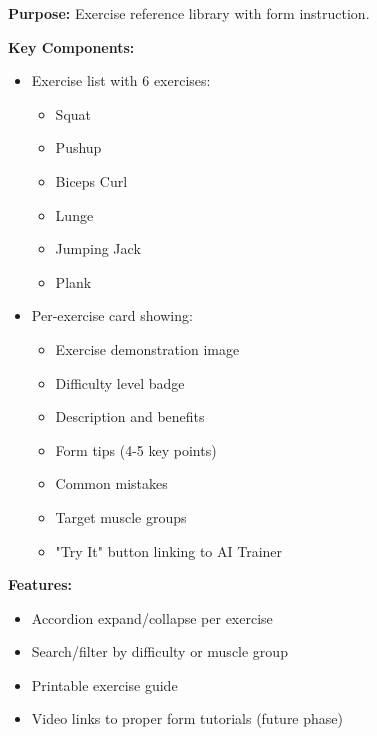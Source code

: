 \documentclass[12pt,a4paper]{article}
\begin{document}
\textbf{Purpose:} Exercise reference library with form instruction.

\textbf{Key Components:}
\begin{itemize}[noitemsep, topsep=2pt]
  \item Exercise list with 6 exercises:
    \begin{itemize}[noitemsep, topsep=0pt]
      \item Squat
      \item Pushup
      \item Biceps Curl
      \item Lunge
      \item Jumping Jack
      \item Plank
    \end{itemize}
  \item Per-exercise card showing:
    \begin{itemize}[noitemsep, topsep=0pt]
      \item Exercise demonstration image
      \item Difficulty level badge
      \item Description and benefits
      \item Form tips (4-5 key points)
      \item Common mistakes
      \item Target muscle groups
      \item "Try It" button linking to AI Trainer
    \end{itemize}
\end{itemize}

\textbf{Features:}
\begin{itemize}[noitemsep, topsep=2pt]
  \item Accordion expand/collapse per exercise
  \item Search/filter by difficulty or muscle group
  \item Printable exercise guide
  \item Video links to proper form tutorials (future phase)
\end{itemize}

\vspace{0.5cm}
\noindent{}
\vspace{1cm}

\end{document}
